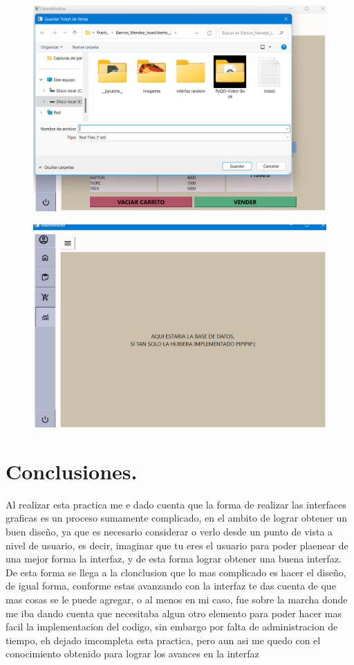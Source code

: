 \documentclass[11pt]{article}
\begin{document}
\begin{figure}[H]
		\begin{center}
 			\includegraphics[width = .6\textwidth]{22.png}
 			
		\end{center} 
\end{figure}

\begin{figure}[H]
		\begin{center}
 			\includegraphics[width = .6\textwidth]{23.png}
 			
		\end{center} 
\end{figure}

\newpage
\section{Conclusiones.}
Al realizar esta practica me e dado cuenta que la forma de realizar las interfaces graficas es un proceso sumamente complicado, en el ambito de lograr obtener un buen diseño, ya que es necesario considerar o verlo desde un punto de vista a nivel de usuario, es decir, imaginar que tu eres el usuario para poder plaenear de una mejor forma la interfaz, y de esta forma lograr obtener una buena interfaz.\\
De esta forma se llega a la clonclusion que lo mas complicado es hacer el diseño, de igual forma, conforme estas avanzando con la interfaz te das cuenta de que mas cosas se le puede agregar, o al menos en mi caso, fue sobre la marcha donde me iba dando cuenta que necesitaba algun otro elemento para poder hacer mas facil la implementacion del codigo, sin embargo por falta de administracion de tiempo, eh dejado imcompleta esta practica, pero aun asi me quedo con el conocimiento obtenido para lograr los avances en la interfaz
\end{document}
